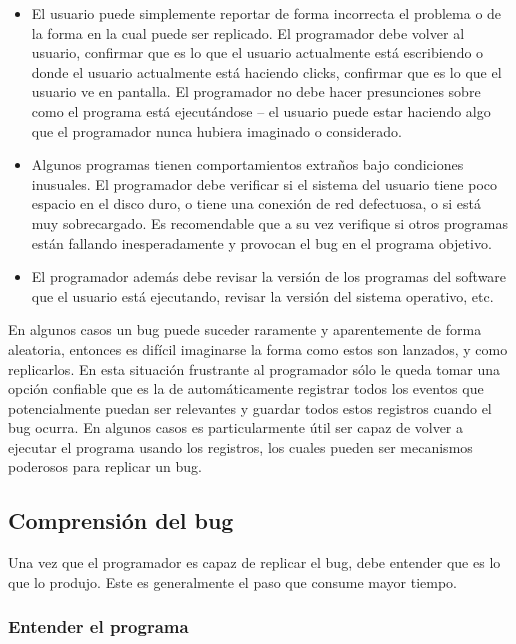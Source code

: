 \documentclass[12pt,legalpaper]{report}
\begin{document}
\begin{itemize}
	\item El usuario puede simplemente reportar de forma incorrecta el problema o de la forma en la cual puede ser replicado.  El programador debe volver al usuario, confirmar que es lo que el usuario actualmente está escribiendo o donde el usuario actualmente está haciendo clicks, confirmar que es lo que el usuario ve en pantalla.  El programador no debe hacer presunciones sobre como el programa está ejecutándose -- el usuario puede estar haciendo algo que el programador nunca hubiera imaginado o considerado.

    \item Algunos programas tienen comportamientos extraños bajo condiciones inusuales.  El programador debe verificar si el sistema del usuario tiene poco espacio en el disco duro, o tiene una conexión de red defectuosa, o si está muy sobrecargado.  Es recomendable que a su vez verifique si otros programas están fallando inesperadamente y provocan el bug en el programa objetivo.

    \item El programador además debe revisar la versión de los programas del software que el usuario está ejecutando, revisar la versión del sistema operativo, etc.
\end{itemize}

En algunos casos un bug puede suceder raramente y aparentemente de forma aleatoria, entonces es difícil imaginarse la forma como estos son lanzados, y como replicarlos.  En esta situación frustrante al programador sólo le queda tomar una opción confiable que es la de automáticamente registrar todos los eventos que potencialmente puedan ser relevantes y guardar todos estos registros cuando el bug ocurra.  En algunos casos es particularmente útil ser capaz de volver a ejecutar el programa usando los registros, los cuales pueden ser mecanismos poderosos para replicar un bug.


\subsection{Comprensión del bug}


Una vez que el programador es capaz de replicar el bug, debe entender que es lo que lo produjo.  Este es generalmente el paso que consume mayor tiempo.


\subsubsection{Entender el programa}
\end{document}
